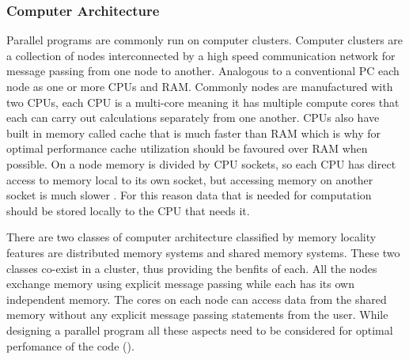 \documentclass[preprint,11pt,authoryear]{elsarticle}
\begin{document}
\subsubsection{Computer Architecture}
\par Parallel programs are commonly run on computer clusters. Computer clusters are a collection of 
nodes interconnected by a high speed communication network for message passing from one node to 
another. Analogous to a conventional PC each node as one or more CPUs and RAM. Commonly nodes 
are manufactured with two CPUs, each CPU is a multi-core meaning it has multiple compute cores 
that each can carry out calculations separately from one another. CPUs also have built in memory 
called cache that is much faster than RAM which is why for optimal performance cache utilization 
should be favoured over RAM when possible. On a node memory is divided by CPU sockets, so each 
CPU has direct access to memory local to its own socket, but accessing memory on another socket is 
much slower \cite{Jin2011}. For this reason data that is needed for computation should be stored 
locally to the CPU that needs it.  
\par There are two classes of computer architecture classified by memory locality features are 
distributed memory systems and shared memory systems. These two classes co-exist in a cluster, 
thus providing the benfits of each. All the nodes exchange memory using explicit message passing 
while each has its own independent memory. The cores on each node can access data from the 
shared memory without any explicit message passing statements from the user. While designing a 
parallel program all these aspects need to be considered for optimal perfomance of the code 
(\cite{Adhianto2007}).
\end{document}
